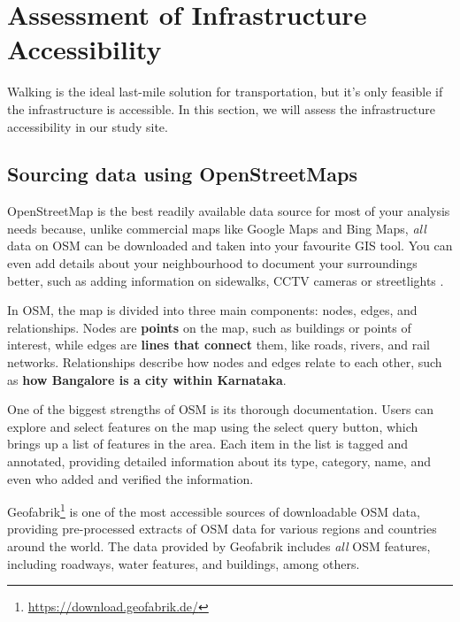 \documentclass[
]{latex/krantz}
\renewcommand{\href}[2]{#2\footnote{\url{#1}}}
\DeclareRobustCommand{\href}[2]{#2\footnote{\url{#1}}}
\begin{document}
\clearpage

\hypertarget{assessment-of-infrastructure-accessibility}{%
\section{Assessment of Infrastructure Accessibility}\label{assessment-of-infrastructure-accessibility}}

Walking is the ideal last-mile solution for transportation, but it's only feasible if the infrastructure is
accessible. In this section, we will assess the infrastructure accessibility in our study site.

\hypertarget{osm-extract}{%
\subsection{Sourcing data using OpenStreetMaps}\label{osm-extract}}

OpenStreetMap is the best readily available data source for most of your analysis needs because, unlike commercial maps like Google Maps and Bing Maps, \emph{all} data on OSM can be downloaded and taken into your favourite GIS tool. You can even add details about your neighbourhood to document your surroundings better, such as adding information on sidewalks, CCTV cameras or streetlights \autocite{safeyelli2022}.

In OSM, the map is divided into three main components: nodes, edges, and relationships. Nodes are \textbf{points} on the map, such as buildings or points of interest, while edges are \textbf{lines that connect} them, like roads, rivers, and rail networks. Relationships describe how nodes and edges relate to each other, such as \textbf{how Bangalore is a city within Karnataka}.

One of the biggest strengths of OSM is its thorough documentation. Users can explore and select features on the map using the select query button, which brings up a list of features in the area. Each item in the list is tagged and annotated, providing detailed information about its type, category, name, and even who added and verified the information.

\href{https://download.geofabrik.de/}{Geofabrik} is one of the most accessible sources of downloadable OSM data, providing pre-processed extracts of OSM data for various regions and countries around the world. The data provided by Geofabrik includes \emph{all} OSM features, including roadways, water features, and buildings, among others.
\end{document}
